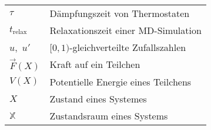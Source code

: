 \begin{tabular}{ll}
$\tau$               & Dämpfungszeit von Thermostaten                                  \\
$t_\text{relax}$     & Relaxationszeit einer MD-Simulation                             \\
$u$,~$u'$            & $[0,1)$-gleichverteilte Zufallszahlen                           \\
$\vec F(X)$          & Kraft auf ein Teilchen                                          \\
$V(X)$               & Potentielle Energie eines Teilchens                             \\
$X$                  & Zustand eines Systemes                                          \\
$\mathbb{X}$         & Zustandsraum eines Systems                                      \\
\end{tabular}


